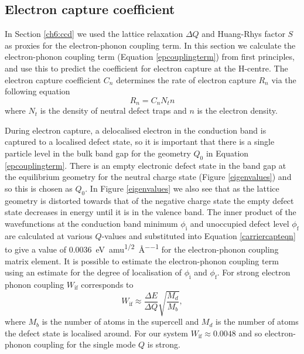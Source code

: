 \subsection{Electron capture coefficient} \label{finalsection}

In Section \ref{ch6:ccd} we used the lattice relaxation $\Delta Q$ and Huang-Rhys factor $S$ as proxies for the electron-phonon coupling term. In this section we calculate the electron-phonon coupling term (Equation \ref{epcouplingterm}) from first principles, and use this to predict the coefficient for electron capture at the H-centre. The electron capture coefficient $C_n$ determines the rate of electron capture $R_n$ via the following equation
\begin{equation} \label{rateeqn}
R_n=C_nN_tn
\end{equation}
where $N_t$ is the density of neutral defect traps and $n$ is the electron density.

During electron capture, a delocalised electron in the conduction band is captured to a localised defect state, so it is important that there is a single particle level in the bulk band gap for the geometry $Q_0$ in Equation \ref{epcouplingterm}.\autocite{Alkauskas2014} There is an empty electronic defect state in the band gap at the equilibrium geometry for the neutral charge state (Figure \ref{eigenvalues}) and so this is chosen as $Q_0$.
In Figure \ref{eigenvalues} we also see that as the lattice geometry is distorted towards that of the negative charge state the empty defect state decreases in energy until it is in the valence band. 
The inner product of the wavefunctions at the conduction band minimum $\phi_\textrm{i}$ and unoccupied defect level $\phi_\textrm{f}$ are calculated at various $Q$-values and substituted into Equation \ref{carriercapteqn} to give a value of \SI{0.0036}{\electronvolt\per amu\tothe{1/2}\per\angstrom} for the electron-phonon coupling matrix element.
It is possible to estimate the electron-phonon coupling term using an estimate for the degree of localisation of $\phi_\textrm{i}$ and $\phi_\textrm{f}$. For strong electron phonon coupling $W_\textrm{if}$ corresponds to 
\begin{equation}
W_\textrm{if} \approx \frac{\Delta E}{\Delta Q}\sqrt{\frac{M_d}{M_b}},
\end{equation}
where $M_b$ is the number of atoms in the supercell and $M_d$ is the number of atoms the defect state is localised around. For our system $W_\textrm{if}\approx0.0048$ and so electron-phonon coupling for the single mode $Q$ is strong.

